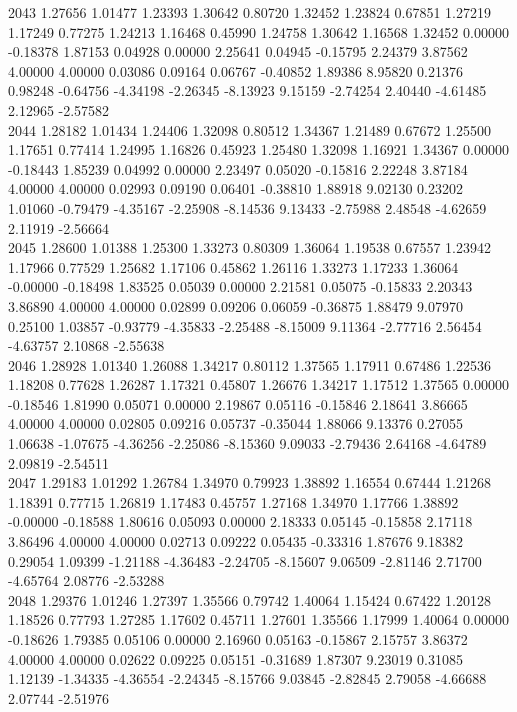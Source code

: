 {2043 1.27656 1.01477 1.23393 1.30642 0.80720 1.32452 1.23824 0.67851 1.27219 1.17249 0.77275 1.24213 1.16468 0.45990 1.24758 1.30642 1.16568 1.32452 0.00000 -0.18378 1.87153 0.04928 0.00000 2.25641 0.04945 -0.15795 2.24379 3.87562 4.00000 4.00000 0.03086 0.09164 0.06767 -0.40852 1.89386 8.95820 0.21376 0.98248 -0.64756 -4.34198 -2.26345 -8.13923 9.15159 -2.74254 2.40440 -4.61485 2.12965 -2.57582 \\
2044 1.28182 1.01434 1.24406 1.32098 0.80512 1.34367 1.21489 0.67672 1.25500 1.17651 0.77414 1.24995 1.16826 0.45923 1.25480 1.32098 1.16921 1.34367 0.00000 -0.18443 1.85239 0.04992 0.00000 2.23497 0.05020 -0.15816 2.22248 3.87184 4.00000 4.00000 0.02993 0.09190 0.06401 -0.38810 1.88918 9.02130 0.23202 1.01060 -0.79479 -4.35167 -2.25908 -8.14536 9.13433 -2.75988 2.48548 -4.62659 2.11919 -2.56664 \\
2045 1.28600 1.01388 1.25300 1.33273 0.80309 1.36064 1.19538 0.67557 1.23942 1.17966 0.77529 1.25682 1.17106 0.45862 1.26116 1.33273 1.17233 1.36064 -0.00000 -0.18498 1.83525 0.05039 0.00000 2.21581 0.05075 -0.15833 2.20343 3.86890 4.00000 4.00000 0.02899 0.09206 0.06059 -0.36875 1.88479 9.07970 0.25100 1.03857 -0.93779 -4.35833 -2.25488 -8.15009 9.11364 -2.77716 2.56454 -4.63757 2.10868 -2.55638 \\
2046 1.28928 1.01340 1.26088 1.34217 0.80112 1.37565 1.17911 0.67486 1.22536 1.18208 0.77628 1.26287 1.17321 0.45807 1.26676 1.34217 1.17512 1.37565 0.00000 -0.18546 1.81990 0.05071 0.00000 2.19867 0.05116 -0.15846 2.18641 3.86665 4.00000 4.00000 0.02805 0.09216 0.05737 -0.35044 1.88066 9.13376 0.27055 1.06638 -1.07675 -4.36256 -2.25086 -8.15360 9.09033 -2.79436 2.64168 -4.64789 2.09819 -2.54511 \\
2047 1.29183 1.01292 1.26784 1.34970 0.79923 1.38892 1.16554 0.67444 1.21268 1.18391 0.77715 1.26819 1.17483 0.45757 1.27168 1.34970 1.17766 1.38892 -0.00000 -0.18588 1.80616 0.05093 0.00000 2.18333 0.05145 -0.15858 2.17118 3.86496 4.00000 4.00000 0.02713 0.09222 0.05435 -0.33316 1.87676 9.18382 0.29054 1.09399 -1.21188 -4.36483 -2.24705 -8.15607 9.06509 -2.81146 2.71700 -4.65764 2.08776 -2.53288 \\
2048 1.29376 1.01246 1.27397 1.35566 0.79742 1.40064 1.15424 0.67422 1.20128 1.18526 0.77793 1.27285 1.17602 0.45711 1.27601 1.35566 1.17999 1.40064 0.00000 -0.18626 1.79385 0.05106 0.00000 2.16960 0.05163 -0.15867 2.15757 3.86372 4.00000 4.00000 0.02622 0.09225 0.05151 -0.31689 1.87307 9.23019 0.31085 1.12139 -1.34335 -4.36554 -2.24345 -8.15766 9.03845 -2.82845 2.79058 -4.66688 2.07744 -2.51976 \\
}

